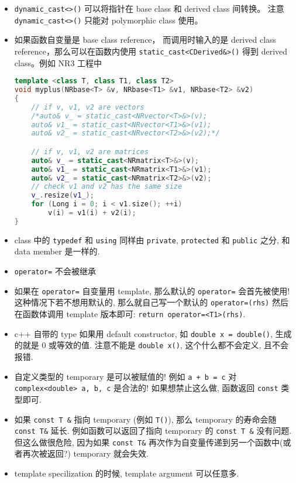 \begin{itemize}
\item \verb|dynamic_cast<>()| 可以将指针在 base class 和 derived class 间转换。 注意 \verb|dynamic_cast<>()| 只能对 polymorphic class 使用。
\item 如果函数自变量是 base class reference， 而调用时输入的是 derived class reference，那么可以在函数内使用 \verb|static_cast<CDerived&>()| 得到 derived class。例如 NR3 工程中
\begin{lstlisting}[language=cpp]
template <class T, class T1, class T2>
void myplus(NRbase<T> &v, NRbase<T1> &v1, NRbase<T2> &v2)
{
	// if v, v1, v2 are vectors
	/*auto& v_ = static_cast<NRvector<T>&>(v);
	auto& v1_ = static_cast<NRvector<T1>&>(v1);
	auto& v2_ = static_cast<NRvector<T2>&>(v2);*/

	// if v, v1, v2 are matrices
	auto& v_ = static_cast<NRmatrix<T>&>(v);
	auto& v1_ = static_cast<NRmatrix<T1>&>(v1);
	auto& v2_ = static_cast<NRmatrix<T2>&>(v2);
	// check v1 and v2 has the same size
	v_.resize(v1_);
	for (Long i = 0; i < v1.size(); ++i)
		v(i) = v1(i) + v2(i);
}
\end{lstlisting}

\item class 中的 \verb`typedef` 和 \verb`using` 同样由 \verb`private`, \verb`protected` 和 \verb`public` 之分, 和 data member 是一样的.
\item \verb`operator=` 不会被继承
\item 如果在 \verb`operator=` 自变量用 template, 那么默认的 \verb`operator=` 会首先被使用! 这种情况下若不想用默认的, 那么就自己写一个默认的 \verb`operator=(rhs)` 然后在函数体调用 template 版本即可: \verb`return operator=<T1>(rhs)`.
\item c++ 自带的 type 如果用 default constructor, 如 \verb`double x = double()`, 生成的就是 0 或等效的值. 注意不能是 \verb`double x()`, 这个什么都不会定义, 且不会报错.
\item 自定义类型的 temporary 是可以被赋值的! 例如 \verb`a + b = c` 对 \verb`complex<double> a, b, c` 是合法的! 如果想禁止这么做, 函数返回 \verb`const` 类型即可.
\item 如果 \verb`const T &` 指向 temporary (例如 \verb`T()`), 那么 temporary 的寿命会随 \verb`const T&` 延长. 例如函数可以返回了指向 temporary 的 \verb`const T &` 没有问题. 但这么做很危险, 因为如果 \verb`const T&` 再次作为自变量传递到另一个函数中(或者再次被返回?) temporary 就会失效.
\item template specilization 的时候, template argument 可以任意多.
\end{itemize}
